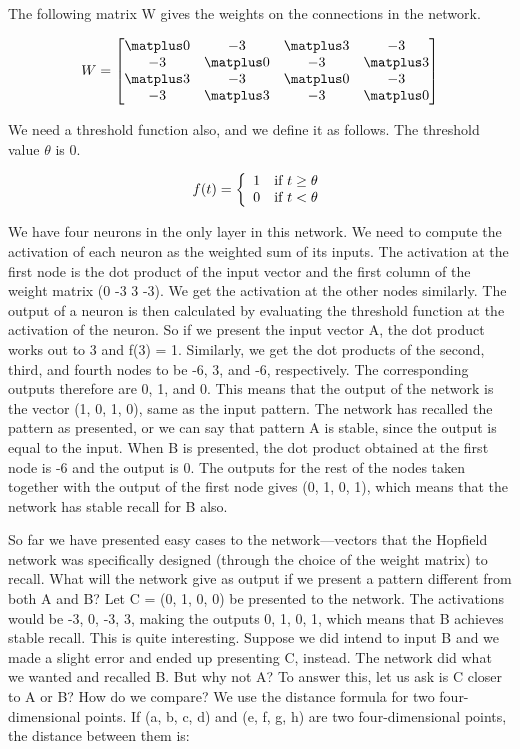 The following matrix W gives the weights on the connections in the network.

\[ 
W = \begin{bmatrix}
 \matplus0 & -3 &  \matplus3 & -3 \\
-3 &  \matplus0 & -3 &  \matplus3 \\
 \matplus3 & -3 &  \matplus0 & -3 \\
-3 &  \matplus3 & -3 &  \matplus0 \\
\end{bmatrix}
\]

We need a threshold function also, and we define it as follows. The threshold value $\theta$ is 0.

\[ f(t) = \left\{ 
                  \begin{array}{l l}
                   1 & \mbox{if $t \geq \theta$}\\
                   0 & \mbox{if $t < \theta$}
                  \end{array} 
          \right. 
\]
 
 
 We have four neurons in the only layer in this network. We need to compute
the activation of each neuron as the weighted sum of its inputs. The activation
at the first node is the dot product of the input vector and the first column of
the weight matrix (0 -3 3 -3). We get the activation at the other nodes
similarly. The output of a neuron is then calculated by evaluating the threshold
function at the activation of the neuron. So if we present the input vector A,
the dot product works out to 3 and f(3) = 1. Similarly, we get the dot products
of the second, third, and fourth nodes to be -6, 3, and -6, respectively. The
corresponding outputs therefore are 0, 1, and 0. This means that the output of
the network is the vector (1, 0, 1, 0), same as the input pattern. The network
has recalled the pattern as presented, or we can say that pattern A is stable,
since the output is equal to the input. When B is presented, the dot product
obtained at the first node is -6 and the output is 0. The outputs for the rest of
the nodes taken together with the output of the first node gives (0, 1, 0, 1),
which means that the network has stable recall for B also.

So far we have presented easy cases to the network—vectors that the Hopfield
network was specifically designed (through the choice of the weight matrix) to
recall. What will the network give as output if we present a pattern different
from both A and B? Let C = (0, 1, 0, 0) be presented to the network. The
activations would be -3, 0, -3, 3, making the outputs 0, 1, 0, 1, which means
that B achieves stable recall. This is quite interesting. Suppose we did intend to
input B and we made a slight error and ended up presenting C, instead. The
network did what we wanted and recalled B. But why not A? To answer this,
let us ask is C closer to A or B? How do we compare? We use the distance
formula for two four-dimensional points. If (a, b, c, d) and (e, f, g, h) are two
four-dimensional points, the distance between them is:

